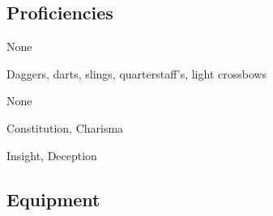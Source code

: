 \documentclass[letterpaper,10pt,twoside,twocolumn,openany]{book}
\begin{document}
\subsection{Proficiencies}

\begin{description}[font=\normalfont\textbf,noitemsep,topsep=1ex,leftmargin=1em]
	\item[Armor:] None
	\item[Weapons:] Daggers, darts, slings, quarterstaff's, light crossbows 
	\item[Tools:] None 
\end{description}

\begin{description}[font=\normalfont\textbf,noitemsep,topsep=1ex,leftmargin=1em]
	\item[Saving Throws:] Constitution, Charisma
	\item[Skills:] Insight, Deception
\end{description}

\subsection{Equipment}
\end{document}
